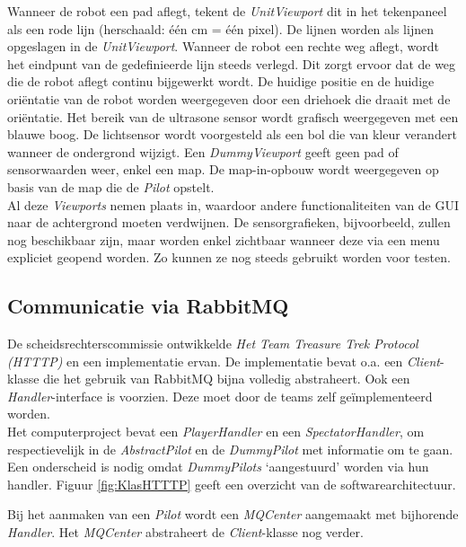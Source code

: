 \documentclass[tt2]{penoverslag}
\begin{document}
Wanneer de robot een pad aflegt, tekent de \textit{UnitViewport} dit in het tekenpaneel als een rode lijn (herschaald: \'e\'en cm = \'e\'en pixel). De lijnen worden als lijnen opgeslagen in de \textit{UnitViewport}. Wanneer de robot een rechte weg aflegt, wordt het eindpunt van de gedefinieerde lijn steeds verlegd. Dit zorgt ervoor dat de weg die de robot aflegt continu bijgewerkt wordt. De huidige positie en de huidige ori\"entatie van de robot worden weergegeven door een driehoek die draait met de ori\"entatie. Het bereik van de ultrasone sensor wordt grafisch weergegeven met een blauwe boog. De lichtsensor wordt voorgesteld als een bol die van kleur verandert wanneer de ondergrond wijzigt. 
Een \textit{DummyViewport} geeft geen pad of sensorwaarden weer, enkel een map. De map-in-opbouw wordt weergegeven op basis van de map die de \textit{Pilot} opstelt.\\

Al deze \textit{Viewports} nemen plaats in, waardoor andere functionaliteiten van de GUI naar de achtergrond moeten verdwijnen. De sensorgrafieken, bijvoorbeeld, zullen nog beschikbaar zijn, maar worden enkel zichtbaar wanneer deze via een menu expliciet geopend worden. Zo kunnen ze nog steeds gebruikt worden voor testen.



\subsection{Communicatie via RabbitMQ}
\label{ssec:RabbMQ}
De scheidsrechterscommissie ontwikkelde \textit{Het Team Treasure Trek Protocol (HTTTP)} en een implementatie ervan. De implementatie bevat o.a. een \textit{Client}-klasse die het gebruik van RabbitMQ bijna volledig abstraheert. Ook een \textit{Handler}-interface is voorzien. Deze moet door de teams zelf ge\"implementeerd worden.\\

Het computerproject bevat een \textit{PlayerHandler} en een \textit{SpectatorHandler}, om respectievelijk in de \textit{AbstractPilot} en de \textit{DummyPilot} met informatie om te gaan. Een onderscheid is nodig omdat \textit{DummyPilots} `aangestuurd' worden via hun handler. Figuur \ref{fig:KlasHTTTP} geeft een overzicht van de softwarearchitectuur.

Bij het aanmaken van een \textit{Pilot} wordt een \textit{MQCenter} aangemaakt met bijhorende \textit{Handler}. Het \textit{MQCenter} abstraheert de \textit{Client}-klasse nog verder.
\end{document}
